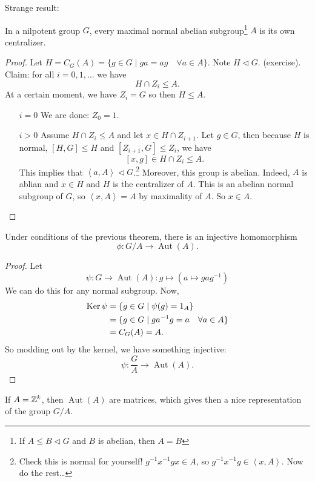 Strange result:

\begin{theorem}[16.2.6]
    In a nilpotent group $G$, every maximal normal abelian subgroup\footnote{If $A \le  B \triangleleft G$ and $B$ is abelian, then $A = B$}  $A$ is its own centralizer.
\end{theorem}
\begin{proof}
    Let $H = C_G(A) = \{g \in G  \mid  g a = a g \quad \forall a \in A\} $.
    Note $H \triangleleft G$. (exercise).
    Claim: for all $i = 0, 1, \ldots$ we have
    \[
    H \cap Z_i \le A
    .\] 
    At a certain moment, we have $Z_i = G$ so then  $H \le A$.
    \begin{itemize}
        \item[$i=0$] We are done: $ Z_0 = 1$.
        \item[$i>0$] Assume $H \cap Z_i \le A$ and let $x \in H \cap Z_{i+1}$.
            Let $g \in G$, then because $H$ is normal,  $[H, G] \le H$ and $[Z_{i+1}, G] \le Z_i$, we have
            \[
                [x, g]  \in H \cap Z_i \le A
            .\] 
            This implies that $\left<a, A \right> \triangleleft G$.\footnote{Check this is normal for yourself! $g^{-1} x^{-1} g x \in A$, so $g^{-1} x^{-1} g \in \left<x, A \right>$. Now do the rest\ldots}
            Moreover, this group is abelian. Indeed, $A$ is ablian and $x \in H$ and $H$ is the centralizer of  $A$. 
            This is an abelian normal subgroup of $G$, so  $\left<x, A \right> = A$ by maximality of $A$. So $x \in A$.
    \end{itemize}
\end{proof}

\begin{corollary}
    Under conditions of the previous theorem, there is an injective homomorphism
    \[
        \phi: G / A \to  \operatorname{Aut}(A)
    .\] 
\end{corollary}
\begin{proof}
    Let \[
        \psi: G \to  \operatorname{Aut}(A): g \mapsto (a \mapsto g a g^{-1})
    \]
    We can do this for any normal subgroup.
    Now, \begin{align*}\operatorname{Ker} \psi &= \{ g \in G  \mid \psi(g) = 1_A\}\\
        &= \{ g \in G  \mid  g a ^{-1} g = a \quad \forall  a \in A\} \\
        &= C_G(A) = A.
    \end{align*}
    So modding out by the kernel, we have something injective:
    \[
        \psi: \frac{G}{A} \to \operatorname{Aut}(A)
    .\] 
\end{proof}
\begin{eg}
    If $A = \mathbb{Z}^{k}$, then $\operatorname{Aut}(A)$ are matrices, which gives then a nice representation of the group $G / A$.
\end{eg}



